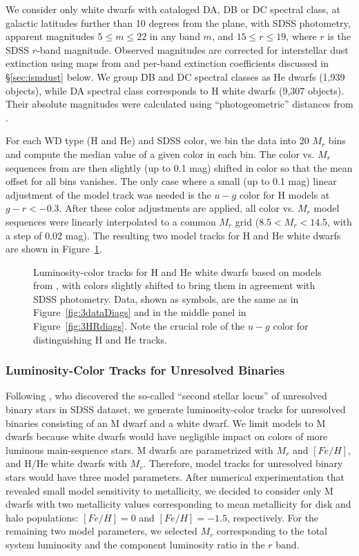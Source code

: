 We consider only white dwarfs with cataloged DA, DB or DC spectral class, at galactic latitudes further than 10 degrees from the plane,
with SDSS photometry, apparent magnitudes $5 \le m \le 22$ in any band $m$, and $15 \le r \le 19$, where $r$ is the SDSS $r$-band magnitude.
Observed magnitudes are corrected for interstellar dust extinction using maps from \cite{schlegel_maps_1998} and per-band extinction coefficients
discussed in \S\ref{sec:ismdust} below. We group DB and DC spectral classes as He dwarfs (1,939 objects), while DA spectral class corresponds
to H white dwarfs (9,307 objects). Their absolute magnitudes were calculated using ``photogeometric'' distances from \cite{bailer-jones_estimating_2021}. 

For each WD type (H and He) and SDSS color, we bin the data into 20 $M_r$ bins and compute the median value of a given color in each bin.
The color vs. $M_r$ sequences from \cite{1995PASP..107.1047B} are then slightly (up to 0.1 mag) shifted in color so that the mean offset for all bins
vanishes. The only case where a small (up to 0.1 mag) linear adjustment of the model track was needed is the $u-g$ color for H models at $g-r<-0.3$. 
After these color adjustments are applied, all color vs. $M_r$ model sequences were linearly interpolated to a common $M_r$ grid ($8.5 < M_r < 14.5$,
with a step of 0.02 mag). The resulting two model tracks for H and He white dwarfs are shown in Figure~\ref{fig:locusWDs}. 
   

\begin{figure}[ht!]
\caption{Luminosity-color tracks for H and He white dwarfs based on models from \cite{1995PASP..107.1047B}, with
  colors slightly shifted to bring them in agreement with SDSS photometry. Data, shown as symbols, are the same as in
  Figure~\ref{fig:3dataDiags} and in the middle panel in Figure~\ref{fig:3HRdiags}. Note the crucial role of the $u-g$ color
  for distinguishing H and He tracks.}
\label{fig:locusWDs}
\end{figure}


\subsubsection{Luminosity-Color Tracks for Unresolved Binaries}

Following \cite{2004ApJ...615L.141S}, who discovered the so-called ``second stellar locus'' of unresolved binary
stars in SDSS dataset, we generate luminosity-color tracks for unresolved binaries consisting of an M dwarf and a white dwarf.
We limit models to M dwarfs because white dwarfs would have negligible impact on colors of more luminous main-sequence stars. 
M dwarfs are parametrized with $M_r$ and $[Fe/H]$, and H/He white dwarfs with $M_r$. Therefore, model tracks for unresolved binary
stars would have three model parameters. After numerical experimentation that revealed small model sensitivity to metallicity, we
decided to consider only M dwarfs with two metallicity values corresponding to mean metallicity for disk and halo populations:
$[Fe/H]=0$ and $[Fe/H]=-1.5$, respectively. For the remaining two model parameters, we selected $M_r$ corresponding to the
total system luminosity and the component luminosity ratio in the $r$ band. 

